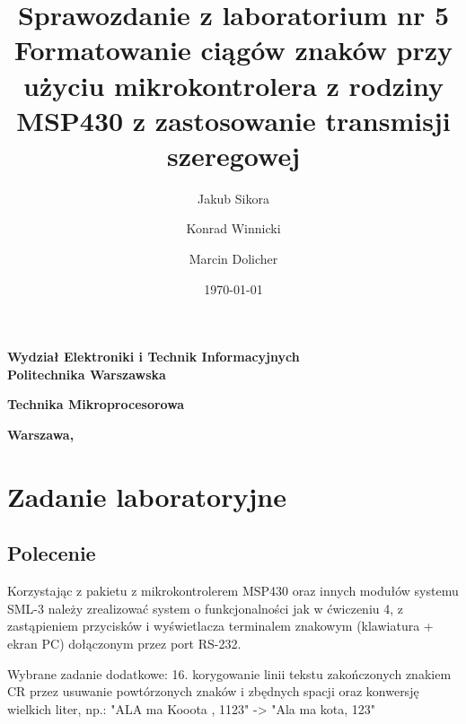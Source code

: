 \documentclass[a4paper,titlepage,11pt,floatssmall]{mwrep}
\title{\bf Sprawozdanie z laboratorium nr 5\\ Formatowanie ciągów znaków przy użyciu mikrokontrolera z rodziny MSP430 z zastosowanie transmisji szeregowej  \vskip 0.1cm}
\author{Jakub Sikora \and Konrad Winnicki \and Marcin Dolicher}
\date{\today}
\begin{document}
\makeatletter
\renewcommand{\maketitle}{\begin{titlepage}
		\begin{center}{\LARGE {\bf
					Wydział Elektroniki i Technik Informacyjnych}}\\
			\vspace{0.4cm}
			{\LARGE {\bf Politechnika Warszawska}}\\
			\vspace{0.3cm}
		\end{center}
		\vspace{5cm}
		\begin{center}
			{\bf \LARGE Technika Mikroprocesorowa \vskip 0.1cm}
		\end{center}
		\vspace{1cm}
		\begin{center}
			{\bf \LARGE \@title}
		\end{center}
		\vspace{2cm}
		\begin{center}
			{\bf \Large \@author \par}
		\end{center}
		\vspace*{\stretch{6}}
		\begin{center}
			\bf{\large{Warszawa, \@date\vskip 0.1cm}}
		\end{center}
	\end{titlepage}
	}
\makeatother
\maketitle

\tableofcontents


\chapter{Zadanie laboratoryjne}
\section{Polecenie}
Korzystając z pakietu z mikrokontrolerem MSP430 oraz innych modułów systemu SML-3 należy zrealizować system o funkcjonalności jak w ćwiczeniu 4, 
z zastąpieniem przycisków i wyświetlacza terminalem znakowym (klawiatura + ekran PC) dołączonym przez port RS-232.

Wybrane zadanie dodatkowe:
16.   korygowanie linii tekstu zakończonych znakiem CR przez usuwanie powtórzonych znaków i zbędnych spacji oraz konwersję wielkich liter, np.:
"ALA ma Kooota  , 1123" -> "Ala ma kota, 123"
\end{document}
